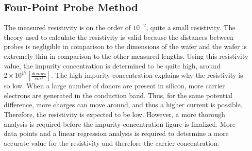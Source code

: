 \documentclass{article}
\begin{document}
	\subsection{Four-Point Probe Method}
The measured resistivity is on the order of $10^{-2}$, quite a small resistivity. The theory used to calculate the resistivity is valid because the distances between probes is negligible in comparison to the dimensions of the wafer and the wafer is extremely thin in comparison to the other measured lengths. Using this resistivity value, the impurity concentration is determined to be quite high, around $2 \times 10^{17} [\frac{donors}{cm^3}]$. The high impurity concentration explains why the resistivity is so low. When a large number of donors are present in silicon, more carrier electrons are generated in the conduction band. Thus, for the same potential difference, more charges can move around, and thus a higher current is possible. Therefore, the resistivity is expected to be low. However, a more thorough analysis is required before the impurity concentration figure is finalized. More data points and a linear regression analysis is required to determine a more accurate value for the resistivity and therefore the carrier concentration.

	
\end{document}
